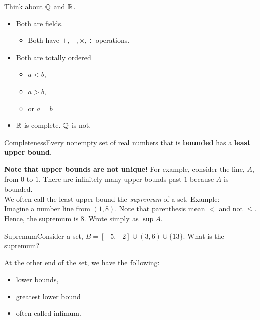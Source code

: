 Think about \(\mathbb{Q}\) and \(\mathbb{R}\).
    \begin{itemize}
        \item Both are fields.
        \begin{itemize}
            \item Both have \(+,-,\times,\div\) operations.
        \end{itemize}
        \item Both are totally ordered
        \begin{itemize}
            \item \(a < b\),
            \item \(a > b\), 
            \item or \(a = b\)
        \end{itemize}
        \item \(\mathbb{R}\) is complete. \(\mathbb{Q}\) is not.
    \end{itemize}
    
\begin{axiom}
    {Completeness}Every nonempty set of real numbers that is \textbf{\gls{bounded}} has a \textbf{\gls{least upper bound}}.
\end{axiom}

\textbf{Note that \glspl{upper bound} are not unique!} For example, consider the line, \(A\), from \(0\) to \(1\). There are infinitely many upper bounds past \(1\) because \(A\) is bounded. \\

We often call the least upper bound the \textit{supremum} of a set. Example: \\

Imagine a number line from \((1,8)\). Note that parenthesis mean \(<\) and not \(\leq\). Hence, the supremum is \(8\). Wrote simply as \(\sup A\). \\

\begin{example}
    {Supremum}Consider a set, \(B = [-5,-2] \cup (3,6) \cup \{13\}\). What is the supremum?
\end{example}


At the other end of the set, we have the following:
\begin{itemize}
    \item lower bounds,
    \item greatest lower bound
    \item often called infimum.
\end{itemize}


